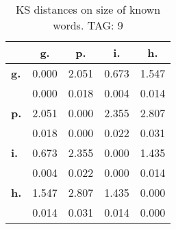 \begin{table}[h!]
\begin{center}
\begin{tabular}{| l || c | c | c | c |}\hline
 & {\bf g.} & {\bf p.} & {\bf i.} & {\bf h.} \\\hline\hline
{\bf g.} & 0.000 & 2.051 & 0.673 & 1.547 \\
{\bf } & 0.000 & 0.018 & 0.004 & 0.014 \\\hline
{\bf p.} & 2.051 & 0.000 & 2.355 & 2.807 \\
{\bf } & 0.018 & 0.000 & 0.022 & 0.031 \\\hline
{\bf i.} & 0.673 & 2.355 & 0.000 & 1.435 \\
{\bf } & 0.004 & 0.022 & 0.000 & 0.014 \\\hline
{\bf h.} & 1.547 & 2.807 & 1.435 & 0.000 \\
{\bf } & 0.014 & 0.031 & 0.014 & 0.000 \\\hline
\end{tabular}
\caption{KS distances on size of known words. TAG: 9}
\end{center}
\end{table}
